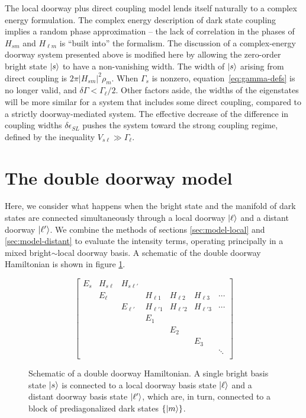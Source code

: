 \documentclass[12pt]{mitthesis}
\begin{document}
The local doorway plus direct coupling model lends itself naturally to
a complex energy formulation.  The complex energy description of dark
state coupling implies a random phase approximation -- the lack of
correlation in the phases of $H_{sm}$ and $H_{\ell m}$ is ``built
into'' the formalism.  The discussion of a complex-energy doorway
system presented above is modified here by allowing the zero-order
bright state $\mathinner{|{s}\rangle}$ to have a non-vanishing width.  The width of
$\mathinner{|{s}\rangle}$ arising from direct coupling is $2 \pi \lvert H_{sm}
\rvert^2 \rho_m$.  When $\Gamma_s$ is nonzero,
equation~\ref{eq:gamma-defs} is no longer valid, and $\delta \Gamma <
\Gamma_\ell / 2$.  Other factors aside, the widths of the eigenstates
will be more similar for a system that includes some direct coupling,
compared to a strictly doorway-mediated system.  The effective
decrease of the difference in coupling widths $\delta \epsilon_{SL}$
pushes the system toward the strong coupling regime, defined by the
inequality $V_{s\ell} \gg \Gamma_\ell$.


\section{The double doorway model}
\label{sec:model-double}

Here, we consider what happens when the bright state and the manifold
of dark states are connected simultaneously through a local doorway
$\mathinner{|{\ell}\rangle}$ and a distant doorway $\mathinner{|{\ell'}\rangle}$. We combine the
methods of sections \ref{sec:model-local} and \ref{sec:model-distant}
to evaluate the intensity terms, operating principally in a mixed
bright$\sim$local doorway basis.  A schematic of the double doorway
Hamiltonian is shown in figure \ref{fig:matrix-double}.

\begin{figure}
  \caption{Schematic of a double doorway Hamiltonian. A single bright
    basis state $\mathinner{|{s}\rangle}$ is connected to a local doorway basis state
    $\mathinner{|{\ell}\rangle}$ and a distant doorway basis state $\mathinner{|{\ell'}\rangle}$, which
    are, in turn, connected to a block of prediagonalized dark states
    $\lbrace \mathinner{|{m}\rangle} \rbrace$.}
  \label{fig:matrix-double}
  \begin{equation*}
    \begin{bmatrix}
    E_s & H_{s \ell} & H_{s\ell'} \\
    & E_\ell & & H_{\ell 1} & H_{\ell 2} & H_{\ell 3} & \dotsm \\
    & & E_{\ell'} & H_{\ell' 1} & H_{\ell' 2} & H_{\ell' 3} & \dotsm \\
    & & & E_1 \\
    & & & & E_2 \\
    & & & & & E_3 \\
    & & & & & & \ddots \\
    \end{bmatrix}
  \end{equation*}
\end{figure}
\end{document}
